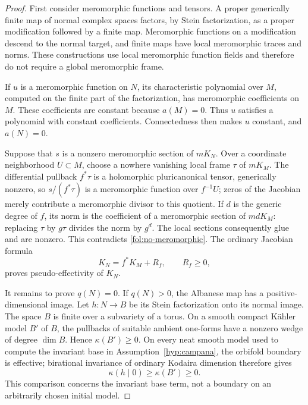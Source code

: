 \documentclass[11pt,letterpaper]{article}
\theoremstyle{definition}
\theoremstyle{remark}
\begin{document}
\begin{proof}
First consider meromorphic functions and tensors.  A proper generically
finite map of normal complex spaces factors, by Stein factorization, as a
proper modification followed by a finite map.  Meromorphic functions on a
modification descend to the normal target, and finite maps have local
meromorphic traces and norms.  These constructions use local meromorphic
function fields and therefore do not require a global meromorphic frame.

If $u$ is a meromorphic function on $N$, its characteristic polynomial over
$M$, computed on the finite part of the factorization, has meromorphic
coefficients on $M$.  These coefficients are constant because $a(M)=0$.
Thus $u$ satisfies a polynomial with constant coefficients.  Connectedness
then makes $u$ constant, and $a(N)=0$.

Suppose that $s$ is a nonzero meromorphic section of $mK_N$.  Over a
coordinate neighborhood $U\subset M$, choose a nowhere vanishing local
frame $\tau$ of $mK_M$.  The differential pullback $f^*\tau$ is a
holomorphic pluricanonical tensor, generically nonzero, so
$s/(f^*\tau)$ is a meromorphic function over $f^{-1}U$; zeros of the
Jacobian merely contribute a meromorphic divisor to this quotient.
If $d$ is the generic degree of $f$, its norm is the coefficient of a
meromorphic section of $mdK_M$: replacing $\tau$ by $g\tau$ divides the
norm by $g^d$.  The local sections consequently glue and are nonzero.
This contradicts \eqref{fol:no-meromorphic}.  The ordinary Jacobian
formula
\[
 K_N=f^*K_M+R_f,\qquad R_f\geq0,
\]
proves pseudo-effectivity of $K_N$.

It remains to prove $q(N)=0$.  If $q(N)>0$, the Albanese map has a
positive-dimensional image.  Let $h\colon N\to B$ be its Stein
factorization onto its normal image.  The space $B$ is finite over a
subvariety of a torus.  On a smooth compact K\"ahler model $B'$ of $B$,
the pullbacks of suitable ambient one-forms have a nonzero wedge of
degree $\dim B$.  Hence $\kappa(B')\geq0$.  On every neat smooth model
used to compute the invariant base in Assumption~\ref{hyp:campana}, the
orbifold boundary is effective; birational invariance of ordinary
Kodaira dimension therefore gives
\[
 \kappa(h\mid0)\geq\kappa(B')\geq0.
\]
This comparison concerns the invariant base term, not a boundary on an
arbitrarily chosen initial model.


\end{proof}
\end{document}
